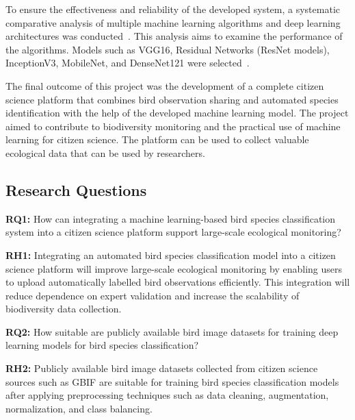 To ensure the effectiveness and reliability of the developed system, a systematic
comparative analysis of multiple machine learning algorithms and deep learning
architectures was conducted~\cite{lolge2025evolution, bilgin2022bird,
tang2025comparative}. This analysis aims to examine the performance of the algorithms.
Models such as VGG16, Residual Networks (ResNet models),
InceptionV3, MobileNet, and DenseNet121 were selected~\cite{lolge2025evolution,
bilgin2022bird, tang2025comparative}.

The final outcome of this project was the development of a complete citizen science platform 
that combines bird observation sharing and automated species identification with the
help of the developed machine learning model. The project aimed to contribute to biodiversity 
monitoring and the practical use of machine learning for citizen science. The platform can be used
to collect valuable ecological data that can be used by researchers.

\subsection{Research Questions}

\textbf{RQ1:} How can integrating a machine learning-based bird species classification system into a citizen science platform support large-scale ecological monitoring?

\textbf{RH1:} Integrating an automated bird species classification model into a citizen science platform will improve large-scale ecological monitoring by enabling users to upload automatically labelled bird observations efficiently. This integration will reduce dependence on expert validation and increase the scalability of biodiversity data collection.

\textbf{RQ2:} How suitable are publicly available bird image datasets for training deep learning models for bird species classification?

\textbf{RH2:} Publicly available bird image datasets collected from citizen science sources such as GBIF are suitable for training bird species classification models after applying preprocessing techniques such as data cleaning, augmentation, normalization, and class balancing.